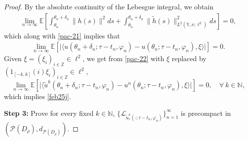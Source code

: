\documentclass[11pt]{article}
\numberwithin{equation}{section}
\theoremstyle{plain}
\begin{document}
\begin{proof}
 By the  absolute continuity of the Lebesgue integral,
 we obtain
 \begin{align*}
       \lim_{n\to \infty }
              \mathbb{E} 
                     \left[ \int_{\theta_n}^{\theta_n + \delta_n} 
                                                              \| h(s) \|^2
                                                       ds  
                              + \int_{\theta_n}^{\theta_n + \delta_n} 
                                                               \| \widetilde{h}(s) \|_{L^2(\mathbb{Y}, \nu; \ell^2) }^2        
                                                       ds  
                     \right]
            = 0,   
 \end{align*} 
 which along with \eqref{pac-21}  implies that
 \begin{align} \label{pac-22}
       \lim_{n\to \infty} 
                 \mathbb{E} 
                        \left[ 
                                 \Big|  
                                          \langle u (
             \theta_n + \delta_n; \tau-t_n,
             \varphi_n  )
                        - u(\theta_n;
                        \tau-t_n, \varphi_n  ), 
                                                       \xi
                                          \rangle
                                 \Big| 
                        \right]  
          = 0.
 \end{align}
 Given $\xi =(\xi_i)_{i\in \mathbb{Z}} \in \ell^2$,  
 we get from \eqref{pac-22} with $\xi$ replaced by 
 $(1_{[-k,k]} (i) \xi_i)_{i \in \mathbb{Z} } \in \ell^2$,
  $$
       \lim_{n\to \infty} 
                 \mathbb{E} 
                        \left[ 
                                 \Big|  
                                          \langle \widetilde{u}^k
                                          (
             \theta_n + \delta_n; \tau -t_n,
             \varphi_n  )
                        - u^n(\theta_n;
                        \tau- t_n,
                        \varphi_n   ), 
                                                       \xi
                                          \rangle
                                 \Big| 
                        \right]  
          = 0,
          \quad \forall \ k\in\mathbb{N},
$$
 which implies \eqref{feb25j}.
 
 {\bf Step 3:} Prove
 for every  fixed  $k\in
 \mathbb{N}$,   
 $\{ \mathcal{L}_{
 \widetilde{u}^k_\tau
                (\cdot; \tau -t_n,
             \varphi_n  )
 }\}_{n=1}^\infty$
 is precompact
 in $ (\mathcal{P}
 (D_\rho), d_{
 \mathcal{P}
 (D_\rho)
 })$.
 

\end{proof}
\end{document}
